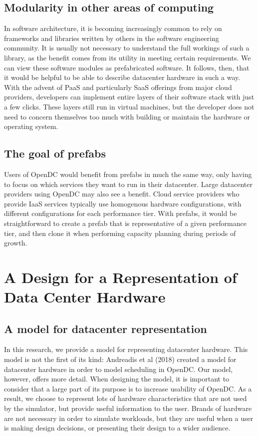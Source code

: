 \documentclass[11pt]{article}
\begin{document}
	\subsection{Modularity in other areas of computing}
		In software architecture, it is becoming increasingly common to rely on frameworks and libraries written by others in the software engineering community. 
		It is usually not necessary to understand the full workings of such a library, as the benefit comes from its utility in meeting certain requirements. 
		We can view these software modules as prefabricated software. 
		It follows, then, that it would be helpful to be able to describe datacenter hardware in such a way. 
		With the advent of PaaS and particularly SaaS offerings from major cloud providers, developers can implement entire layers of their software stack with just a few clicks. 
		These layers still run in virtual machines, but the developer does not need to concern themselves too much with building or maintain the hardware or operating system.
	\subsection{The goal of prefabs}
		Users of OpenDC would benefit from prefabs in much the same way, only having to focus on which services they want to run in their datacenter.
		Large datacenter providers using OpenDC may also see a benefit. 
		Cloud service providers who provide IaaS services typically use homogenous hardware configurations, with different configurations for each performance tier. 
		With prefabs, it would be straightforward to create a prefab that is representative of a given performance tier, and then clone it when performing capacity planning during periods of growth.


\section{A Design for a Representation of Data Center Hardware}

	\subsection{A model for datacenter representation}
		In this research, we provide a model for representing datacenter hardware. 
		This model is not the first of its kind: Andreadis et al (2018) created a model for datacenter hardware in order to model scheduling in OpenDC. 
		Our model, however, offers more detail. 
		When designing the model, it is important to consider that a large part of its purpose is to increase usability of OpenDC. 
		As a result, we choose to represent lots of hardware characteristics that are not used by the simulator, but provide useful information to the user. 
		Brands of hardware are not necessary in order to simulate workloads, but they are useful when a user is making design decisions, or presenting their design to a wider audience.
\end{document}
